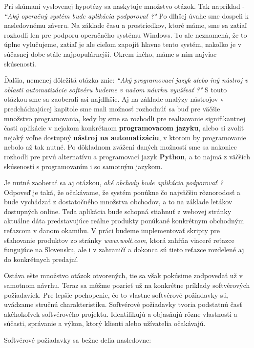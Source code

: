 \documentclass[twoside,slovak, a4paper]{article}
\begin{document}
Pri skúmaní vyslovenej hypotézy sa naskytuje množstvo otázok. Tak napríklad - \textit{``Aký operačný systém bude aplikácia podporovať ?"} Po dlhšej úvahe sme dospeli k nasledovnému záveru. Na základe času a prostriedkov, ktoré máme, sme sa zatiaľ rozhodli len pre podporu operačného systému Windows. To ale neznamená, že to úplne vylučujeme, zatiaľ je ale cieľom zapojiť hlavne tento systém, nakoľko je v súčasnej dobe stále najpopulárnejší. Okrem iného, máme s ním najviac skúseností.

Ďalšia, nemenej dôležitá otázka znie: \textit{``Aký programovací jazyk alebo iný nástroj v oblasti automatizácie softvéru budeme v našom návrhu využívať ?"} S touto otázkou sme sa zaoberali asi najdlhšie. Aj na základe analýzy nástrojov v predchádzajúcej kapitole sme mali možnosť rozhodnúť sa buď pre väčšie množstvo programovania, kedy by sme sa rozhodli pre realizovanie signifikantnej časti aplikácie v nejakom konkrétnom \textbf{programovacom jazyku}, alebo si zvoliť nejaký voľne dostupný \textbf{nástroj na automatizáciu}, v ktorom by programovanie nebolo až tak nutné. Po dôkladnom zvážení daných možností sme sa nakoniec rozhodli pre prvú alternatívu a programovací jazyk \textbf{Python}, a to najmä z väčších skúseností s programovaním i so samotným jazykom.

Je nutné zaoberať sa aj otázkou, \textit{aké obchody bude aplikácia podporovať ?} Odpoveď je taká, že očakávame, že systém ponúkne čo najväčšiu rôznorodosť a bude vychádzať z dostatočného množstva obchodov, a to na základe letákov dostupných online. Teda aplikácia bude schopná stiahnuť z webovej stránky aktuálne dáta predstavujúce reálne produkty ponúkané konkrétnym obchodným reťazcom v danom okamihu. V práci budeme implementovať skripty pre sťahovanie produktov zo stránky \textit{www.wolt.com}, ktorá zahŕňa viaceré reťazce fungujúce na Slovensku, ale i v zahraničí a dokonca sú tieto reťazce rozdelené aj do konkrétnych predajní.

Ostáva ešte množstvo otázok otvorených, tie sa však pokúsime zodpovedať už v samotnom návrhu. Teraz sa môžme pozrieť už na konkrétne príklady softvérových požiadaviek.
Pre lepšie pochopenie, čo to vlastne softvérové požiadavky sú, uvádzame stručnú charakteristiku. Softvérové požiadavky tvoria podstatnú časť akéhokoľvek softvérového projektu. Identifikujú a objasňujú rôzne vlastnosti a súčasti, správanie a výkon, ktorý klienti alebo užívatelia očakávajú.\cite{SB:TSR}

Softvérové požiadavky sa bežne delia nasledovne:
\end{document}
